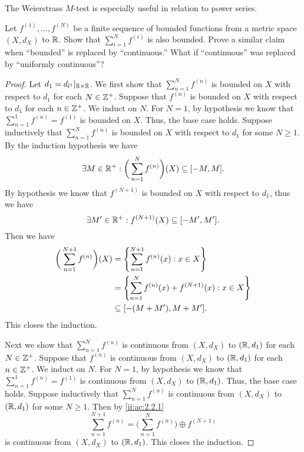 \begin{note}
  The Weierstrass \(M\)-test is especially useful in relation to power series.
\end{note}

\exercisesection

\begin{ex}\label{ii:ex:3.5.1}
  Let \(f^{(1)}, \dots, f^{(N)}\) be a finite sequence of bounded functions from a metric space \((X, d_X)\) to \(\mathbb{R}\).
  Show that \(\sum_{i = 1}^N f^{(i)}\) is also bounded.
  Prove a similar claim when ``bounded'' is replaced by ``continuous.''
  What if ``continuous'' was replaced by ``uniformly continuous''?
\end{ex}

\begin{proof}
  Let \(d_1 = d_{l^1}|_{\mathbb{R} \times \mathbb{R}}\).
  We first show that \(\sum_{n = 1}^N f^{(n)}\) is bounded on \(X\) with respect to \(d_1\) for each \(N \in \mathbb{Z}^+\).
  Suppose that \(f^{(n)}\) is bounded on \(X\) with respect to \(d_1\) for each \(n \in \mathbb{Z}^+\).
  We induct on \(N\).
  For \(N = 1\), by hypothesis we know that \(\sum_{n = 1}^1 f^{(n)} = f^{(1)}\) is bounded on \(X\).
  Thus, the base case holds.
  Suppose inductively that \(\sum_{n = 1}^N f^{(n)}\) is bounded on \(X\) with respect to \(d_1\) for some \(N \geq 1\).
  By the induction hypothesis we have
  \[
    \exists M \in \mathbb{R}^+ : \bigg(\sum_{n = 1}^N f^{(n)}\bigg)(X) \subseteq [-M, M].
  \]
  By hypothesis we know that \(f^{(N + 1)}\) is bounded on \(X\) with respect to \(d_1\), thus we have
  \[
    \exists M' \in \mathbb{R}^+ : f^{(N + 1)}(X) \subseteq [-M', M'].
  \]
  Then we have
  \begin{align*}
    \bigg(\sum_{n = 1}^{N + 1} f^{(n)}\bigg)(X) & = \left\lbrace\sum_{n = 1}^{N + 1} f^{(n)}(x) : x \in X\right\rbrace            \\
                                                & = \left\lbrace\sum_{n = 1}^N f^{(n)}(x) + f^{(N + 1)}(x) : x \in X\right\rbrace \\
                                                & \subseteq [-(M + M'), M + M'].
  \end{align*}
  This closes the induction.

  Next we show that \(\sum_{n = 1}^N f^{(n)}\) is continuous from \((X, d_X)\) to \((\mathbb{R}, d_1)\) for each \(N \in \mathbb{Z}^+\).
  Suppose that \(f^{(n)}\) is continuous from \((X, d_X)\) to \((\mathbb{R}, d_1)\) for each \(n \in \mathbb{Z}^+\).
  We induct on \(N\).
  For \(N = 1\), by hypothesis we know that \(\sum_{n = 1}^1 f^{(n)} = f^{(1)}\) is continuous from \((X, d_X)\) to \((\mathbb{R}, d_1)\).
  Thus, the base case holds.
  Suppose inductively that \(\sum_{n = 1}^N f^{(n)}\) is continuous from \((X, d_X)\) to \((\mathbb{R}, d_1)\) for some \(N \geq 1\).
  Then by \cref{ii:ac:2.2.1}
  \[
    \sum_{n = 1}^{N + 1} f^{(n)} = \bigg(\sum_{n = 1}^N f^{(n)}\bigg) \oplus f^{(N + 1)}
  \]
  is continuous from \((X, d_X)\) to \((\mathbb{R}, d_1)\).
  This closes the induction.


\end{proof}
